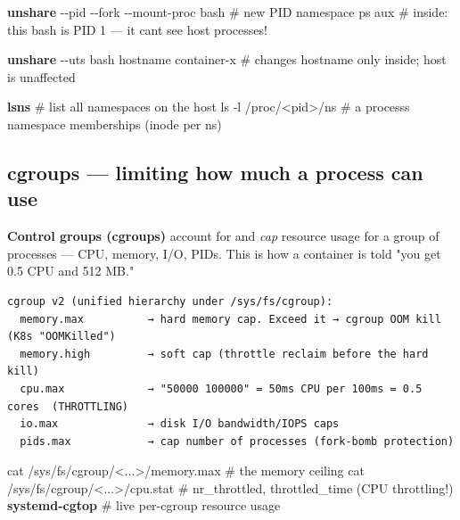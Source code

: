 \documentclass[11pt]{article}
\newenvironment{Shaded}{\begin{snugshade}}{\end{snugshade}}
\newcommand{\AttributeTok}[1]{\textcolor[rgb]{0.16,0.50,0.73}{#1}}
\newcommand{\CommentTok}[1]{\textcolor[rgb]{0.48,0.49,0.49}{#1}}
\newcommand{\ExtensionTok}[1]{\textcolor[rgb]{0.00,0.60,1.00}{\textbf{#1}}}
\newcommand{\FunctionTok}[1]{\textcolor[rgb]{0.56,0.27,0.68}{#1}}
\newcommand{\NormalTok}[1]{\textcolor[rgb]{0.81,0.81,0.76}{#1}}
\newcommand{\OperatorTok}[1]{\textcolor[rgb]{0.81,0.81,0.76}{#1}}
\begin{document}
\begin{Shaded}
\begin{Highlighting}[]
\ExtensionTok{unshare} \AttributeTok{{-}{-}pid} \AttributeTok{{-}{-}fork} \AttributeTok{{-}{-}mount{-}proc}\NormalTok{ bash   }\CommentTok{\# new PID namespace}
\FunctionTok{ps}\NormalTok{ aux        }\CommentTok{\# inside: this bash is PID 1 — it can\textquotesingle{}t see host processes!}

\ExtensionTok{unshare} \AttributeTok{{-}{-}uts}\NormalTok{ bash}
\FunctionTok{hostname}\NormalTok{ container{-}x   }\CommentTok{\# changes hostname only inside; host is unaffected}

\ExtensionTok{lsns}                   \CommentTok{\# list all namespaces on the host}
\FunctionTok{ls} \AttributeTok{{-}l}\NormalTok{ /proc/}\OperatorTok{\textless{}}\NormalTok{pid}\OperatorTok{\textgreater{}}\NormalTok{/ns   }\CommentTok{\# a process\textquotesingle{}s namespace memberships (inode per ns)}
\end{Highlighting}
\end{Shaded}

\subsection{cgroups --- limiting how much a process can use}\label{cgroups--limiting-how-much-a-process-can-use}

\textbf{Control groups (cgroups)} account for and \emph{cap} resource usage for a group of processes --- CPU, memory, I/O, PIDs. This is how a container is told "you get 0.5 CPU and 512 MB."

\setcodelang{}

\begin{verbatim}
cgroup v2 (unified hierarchy under /sys/fs/cgroup):
  memory.max          → hard memory cap. Exceed it → cgroup OOM kill (K8s "OOMKilled")
  memory.high         → soft cap (throttle reclaim before the hard kill)
  cpu.max             → "50000 100000" = 50ms CPU per 100ms = 0.5 cores  (THROTTLING)
  io.max              → disk I/O bandwidth/IOPS caps
  pids.max            → cap number of processes (fork-bomb protection)
\end{verbatim}


\begin{Shaded}
\begin{Highlighting}[]
\FunctionTok{cat}\NormalTok{ /sys/fs/cgroup/}\OperatorTok{\textless{}}\NormalTok{...}\OperatorTok{\textgreater{}}\NormalTok{/memory.max        }\CommentTok{\# the memory ceiling}
\FunctionTok{cat}\NormalTok{ /sys/fs/cgroup/}\OperatorTok{\textless{}}\NormalTok{...}\OperatorTok{\textgreater{}}\NormalTok{/cpu.stat          }\CommentTok{\# nr\_throttled, throttled\_time (CPU throttling!)}
\ExtensionTok{systemd{-}cgtop}                              \CommentTok{\# live per{-}cgroup resource usage}
\end{Highlighting}
\end{Shaded}
\end{document}
